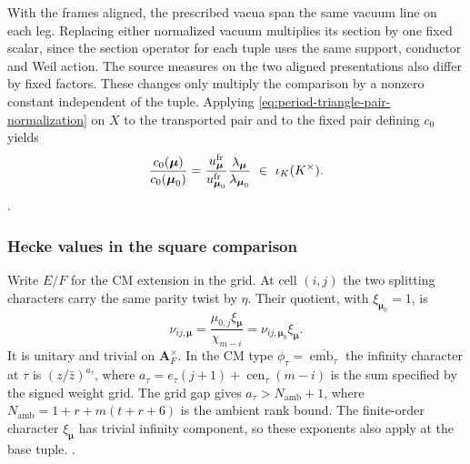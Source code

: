 With the frames aligned, the prescribed vacua span the same
vacuum line on each leg. Replacing either normalized vacuum
multiplies its section by one fixed scalar, since the section
operator for each tuple uses the same support, conductor and Weil
action. The source measures on the two aligned presentations also
differ by fixed factors. These changes only multiply the comparison
by a nonzero constant independent of the tuple. Applying
\eqref{eq:period-triangle-pair-normalization} on \(X\) to the
transported pair and to the fixed pair defining \(c_0\) yields
\begin{equation}
 \frac{c_0(\boldsymbol\mu)}{c_0(\boldsymbol\mu_0)}
   =\frac{u^{\rm fr}_{\boldsymbol\mu}}{u^{\rm fr}_{\boldsymbol\mu_0}}
      \frac{\lambda_{\boldsymbol\mu}}{\lambda_{\boldsymbol\mu_0}}
   \ \in\ \iota_K(K^\times).
 \label{eq:period-bottom-constant-field}
\end{equation}
.

\subsubsection{Hecke values in the square comparison}
Write \(E/F\) for the CM extension in the grid. At cell \((i,j)\)
the two splitting characters carry the same parity twist by \(\eta\).
Their quotient, with \(\xi_{\boldsymbol\mu_0}=1\), is
\[
  \nu_{ij,\boldsymbol\mu}
    =\frac{\mu_{0,j}\xi_{\boldsymbol\mu}}{\chi_{m-i}}
    =\nu_{ij,\boldsymbol\mu_0}\xi_{\boldsymbol\mu}.
\]
It is unitary and trivial on \(\mathbf A_F^\times\). In the CM type
\(\phi_\tau=\overline{\operatorname{emb}_\tau}\) the infinity character
at \(\tau\) is \((z/\bar z)^{a_\tau}\), where
\(a_\tau=e_\tau(j+1)+\operatorname{cen}_\tau(m-i)\) is the sum specified
by the signed weight grid. The grid gap gives
\(a_\tau>N_{\mathrm{amb}}+1\), where
\(N_{\mathrm{amb}}=1+r+m(t+r+6)\) is the ambient rank bound.
The finite-order character \(\xi_{\boldsymbol\mu}\) has trivial
infinity component, so these exponents also apply at the base tuple.
.

